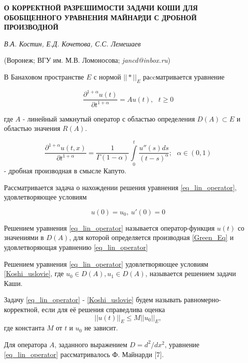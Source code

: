 
\begin{center}
    {\bf О КОРРЕКТНОЙ РАЗРЕШИМОСТИ ЗАДАЧИ КОШИ ДЛЯ ОБОБЩЕННОГО УРАВНЕНИЯ МАЙНАРДИ С ДРОБНОЙ ПРОИЗВОДНОЙ}

    {\it В.А. Костин, Е.Д. Кочетова, С.С. Лемешаев}

    (Воронеж; ВГУ им. М.В. Ломоносова; {\it jancd@inbox.ru})
\end{center}



В Банаховом пространстве $E$ с нормой $||*||_E$ раccматривается уравнение

\begin{equation}\label{eq_lin_operator}
	\frac{\partial^{1+\alpha} u(t)}{\partial t^{1+\alpha}} = Au(t), \ \ \ t \geqslant 0
\end{equation}

где $A$  - линейный замкнутый оператор с областью определения $D(A) \subset E$ и областью значения $R(A)$.

\begin{equation}\label{Green_Eq}
        \frac{\partial^{1+\alpha}u(t,x)}{\partial t^{1+\alpha}} = \frac{1}{\Gamma(1-\alpha)} \int\limits_0^t \frac{u''(s)ds}{(t - s)^{\alpha}}; \ \ \ \alpha \in (0, 1)
\end{equation}
 - дробная производная в смысле Капуто.
\vspace{3mm}


Рассматривается задача о нахождении решения уравнения \ref{eq_lin_operator}, удовлетворяющее условиям

\begin{equation}\label{Koshi_uslovie}
	u(0) = u_0, \ u'(0) = 0
\end{equation}

\begin{definition}
	Решением уравнения \ref{eq_lin_operator} называется оператор-функция $u(t)$ со значениями в $D(A)$, для которой определяется производная \ref{Green_Eq} и удовлетворяющая уравнению \ref{eq_lin_operator}
\end{definition}

\begin{definition}
	Решением уравнения \ref{eq_lin_operator} удовлетворяющее условиям \ref{Koshi_uslovie}, где $u_0 \in D(A), u_1 \in D(A)$, называется решением задачи Каши.
\end{definition}

\begin{definition}
	Задачу \ref{eq_lin_operator} - \ref{Koshi_uslovie} будем называть равномерно-корректной, если для её решения справедлива оценка
	\begin{equation}\label{ocenka}
		||u(t)||_E \leq M||u_0||_E,
	\end{equation}
	где константа $M$ от $t$ и $u_0$ не зависит.
\end{definition}
Для оператора $A$, заданного выражением $D=d^2/dx^2$, уравнение \ref{eq_lin_operator} рассматривалось Ф. Майнарди [7].
\vspace{3mm}


